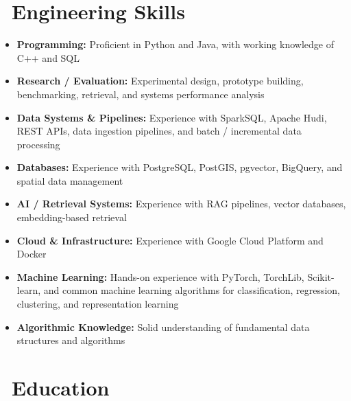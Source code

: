 \documentclass{resume}
\begin{document}
\section{\faCogs\ \textbf{Engineering Skills}}

\begin{itemize}[parsep=0.4ex]

\item \textbf{Programming:} Proficient in Python and Java, with working knowledge of C++ and SQL

\item \textbf{Research / Evaluation:} Experimental design, prototype building, benchmarking, retrieval, and systems performance analysis

\item \textbf{Data Systems \& Pipelines:} Experience with SparkSQL, Apache Hudi, REST APIs, data ingestion pipelines, and batch / incremental data processing

\item \textbf{Databases:} Experience with PostgreSQL, PostGIS, pgvector, BigQuery, and spatial data management

\item \textbf{AI / Retrieval Systems:} Experience with RAG pipelines, vector databases, embedding-based retrieval

\item \textbf{Cloud \& Infrastructure:} Experience with Google Cloud Platform and Docker

\item \textbf{Machine Learning:} Hands-on experience with PyTorch, TorchLib, Scikit-learn, and common machine learning algorithms for classification, regression, clustering, and representation learning

  \item \textbf{Algorithmic Knowledge:} Solid understanding of fundamental data structures and algorithms
\end{itemize}

\section{\faGraduationCap\ \textbf{Education}}
\end{document}
